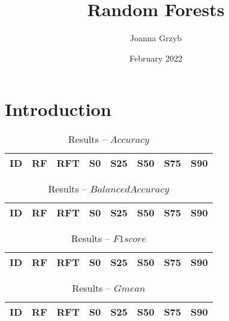 \documentclass{llncs}
\title{Random Forests}
\author{Joanna Grzyb}
\date{February 2022}
\begin{document}
\maketitle

\section{Introduction}

\begin{table}[!ht]
\centering
\caption{Results -- $Accuracy$}
\begin{tabular}{r c c c c c c c}
  \hline
\textbf{ID} & \textbf{RF} & \textbf{RFT} & \textbf{S0} & \textbf{S25} & \textbf{S50} & \textbf{S75} & \textbf{S90}\\
    \hline
    
\end{tabular}
\end{table}

\begin{table}[!ht]
\centering
\caption{Results -- $Balanced Accuracy$}
\begin{tabular}{r c c c c c c c}
  \hline
\textbf{ID} & \textbf{RF} & \textbf{RFT} & \textbf{S0} & \textbf{S25} & \textbf{S50} & \textbf{S75} & \textbf{S90}\\
    \hline
    
\end{tabular}
\end{table}

\begin{table}[!ht]
\centering
\caption{Results -- $F1score$}
\begin{tabular}{r c c c c c c c}
  \hline
\textbf{ID} & \textbf{RF} & \textbf{RFT} & \textbf{S0} & \textbf{S25} & \textbf{S50} & \textbf{S75} & \textbf{S90}\\
    \hline
    
\end{tabular}
\end{table}

\begin{table}[!ht]
\centering
\caption{Results -- $Gmean$}
\begin{tabular}{r c c c c c c c}
  \hline
\textbf{ID} & \textbf{RF} & \textbf{RFT} & \textbf{S0} & \textbf{S25} & \textbf{S50} & \textbf{S75} & \textbf{S90}\\
    \hline
    
\end{tabular}
\end{table}
\end{document}
